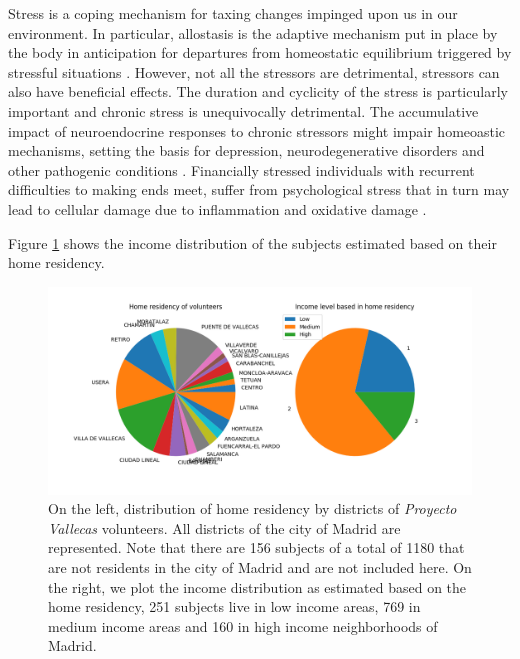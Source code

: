 \documentclass[11pt]{article}
\theoremstyle{definition}
\theoremstyle{remark}
\begin{document}
Stress is a coping mechanism for taxing changes impinged upon us in our environment. In particular, allostasis is the adaptive mechanism put in place by the body in anticipation for departures from homeostatic equilibrium triggered by stressful situations \cite{ellis2014beyond}. However, not all the stressors are detrimental, stressors can also have beneficial effects. 
The duration and cyclicity of the stress is particularly important and chronic stress is unequivocally detrimental. The accumulative impact of neuroendocrine responses to chronic stressors might impair homeoastic mechanisms, setting the basis for depression, neurodegenerative disorders and other pathogenic conditions \cite{bisht2018chronic}. Financially stressed individuals with recurrent difficulties to making ends meet, suffer from psychological stress that in turn may lead to cellular damage due to inflammation and oxidative damage \cite{hayashi2015conversion}. 

Figure \ref{fig:incomeresidency} shows the income distribution of the subjects estimated based on their home residency. 


\begin{figure}[H]
        \centering
        \includegraphics[keepaspectratio, width=\linewidth]{figures/incomeresidency}
        \caption{On the left, distribution of home residency by districts of \emph{Proyecto Vallecas} volunteers. All districts of the city of Madrid are represented. Note that there are 156 subjects of a total of 1180 that are not residents in the city of Madrid and are not included here. On the right, we plot the income distribution as estimated based on the home residency, 251 subjects live in low income areas, 769 in medium income areas and 160 in high income neighborhoods of Madrid.
        } \label{fig:incomeresidency}
\end{figure}
\end{document}
